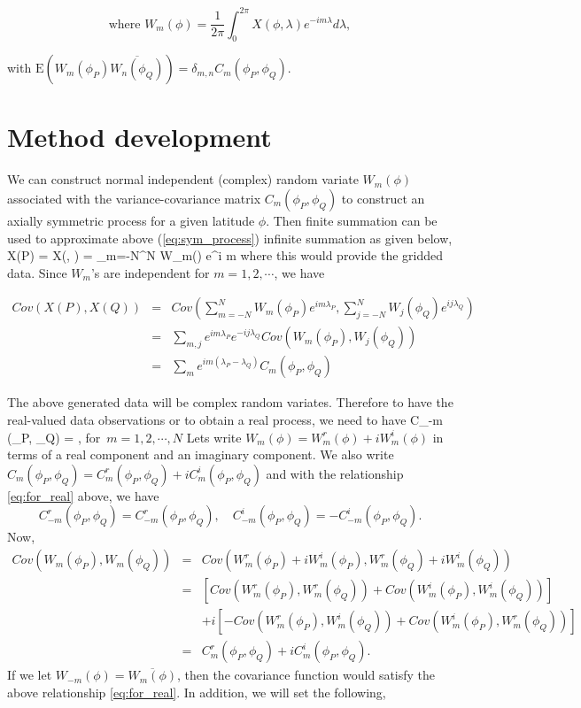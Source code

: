 	\[
		\mbox{where } W_m(\phi) = \frac{1}{2\pi} \int_0^{2\pi} X(\phi, \lambda) e^{-i m \lambda} d \lambda,
	\]
			
	with $\mbox{E}(W_m(\phi_P) \overline{W_n(\phi_Q)}) = \delta_{m,n} C_m(\phi_P, \phi_Q)$. \\
		

	\section{Method development}
			
			
	We can construct normal independent (complex) random variate $W_m(\phi)$ associated with the variance-covariance matrix $C_m(\phi_P, \phi_Q)$ to construct an axially symmetric process for a given latitude $\phi$. Then finite summation can be used to approximate above (\ref{eq:sym_process}) infinite summation as given below,
	\beq
	X(P) = X(\phi, \lambda) = \sum_{m=-N}^{N} W_m(\phi) e^{i m \lambda}
	\eeq
	where this would provide  the gridded data.
	Since $W_m$'s are independent for $m = 1, 2, \cdots$, we have
			
	\begin{eqnarray*}
		Cov(X(P), {X(Q)}) &=& Cov\left(\sum_{m = -N}^{N} W_m(\phi_P) e^{i m \lambda_P}, \sum_{j=-N}^{N} {W_j(\phi_Q)} e^{i j \lambda_Q}\right) \\
		&=& \sum_{m, j} e^{i m \lambda_P} e^{-i j \lambda_Q} Cov(W_m(\phi_P), {W_j(\phi_Q)}) \\
		&=& \sum_{m} e^{im (\lambda_P - \lambda_Q)} C_m(\phi_P, \phi_Q)
	\end{eqnarray*}
			
	The above generated data will be complex random variates. Therefore to have the real-valued data observations or to obtain a real process, we need to have
	\beq \label{eq:for_real}
	C_{-m} (\phi_P, \phi_Q) = , \quad \mbox{for $m = 1, 2, \cdots, N$}
	\eeq
	Lets write $W_m(\phi) = W_{m}^{r}(\phi) + i W_{m}^i(\phi)$ in terms of a real component and an imaginary component. We also write $C_m(\phi_P, \phi_Q) = C_m^r(\phi_P, \phi_Q) + i C_m^i(\phi_P, \phi_Q)$
	and with the relationship \ref{eq:for_real} above, we have
	\[
		C_{-m}^r(\phi_P, \phi_Q) = C_{-m}^r(\phi_P, \phi_Q), \quad C_{-m}^i(\phi_P, \phi_Q) = - C_{-m}^i(\phi_P, \phi_Q).
	\]
	Now,
	\begin{eqnarray*}
		Cov(W_m(\phi_P), {W_m(\phi_Q)}) &=& Cov(W_m^r(\phi_P) + iW_m^i(\phi_P), W_m^r(\phi_Q) + i W_m^i(\phi_Q)) \\
		&=& \left[Cov(W_m^r(\phi_P), W_m^r(\phi_Q)) + Cov(W_m^i(\phi_P), W_m^i(\phi_Q))\right] \\
		& & + i\left[- Cov(W_m^r(\phi_P), W_m^i(\phi_Q)) + Cov(W_m^i(\phi_P), W_m^r(\phi_Q))\right] \\
		&=& C_m^r(\phi_P, \phi_Q) + i C_m^i(\phi_P, \phi_Q).
	\end{eqnarray*}
	If we let $W_{-m}(\phi) = \overline{W_m(\phi)}$, then the covariance function would satisfy the above relationship \ref{eq:for_real}. In addition, we will set the following,
			
